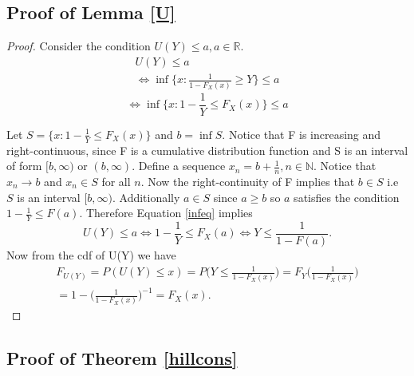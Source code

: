 \documentclass[english,12pt,a4paper,pdftex,sci,utf8]{aaltothesis} %
\begin{document}
\subsection{Proof of Lemma \ref{U}}

\begin{proof}
Consider the condition $U(Y) \leq a, a \in \mathbb{R}$.
\begin{equation*}
\begin{split}
U(Y) \leq a \\
\Leftrightarrow \inf\big\{x: \frac{1}{1-F_X(x)} \geq Y\big\} \leq a
\end{split}
\end{equation*}
\begin{equation}
\Leftrightarrow \inf\big\{x: 1 - \frac{1}{Y} \leq F_X(x)\big\} \leq a
\label{infeq}
\end{equation}


Let $S=\big\{x: 1 - \frac{1}{Y} \leq F_X(x)\big\}$ and $b = \inf S$. Notice that F is increasing and right-continuous, since F is a cumulative distribution function and S is an interval of form $[b,\infty)$ or $(b, \infty)$. Define a sequence $x_n=b+\frac{1}{n}, n\in \mathbb{N}$. Notice that $x_n \rightarrow b$ and $x_n \in S$ for all $n$. Now the right-continuity of F implies that $b \in S$ i.e $S$ is an interval $[b, \infty)$. Additionally $a \in S$ since $a\geq b$ so $a$ satisfies the condition $1-\frac{1}{Y} \leq F(a)$. Therefore Equation \eqref{infeq} implies
\begin{equation*}
U(Y) \leq a \Leftrightarrow 1 - \frac{1}{Y} \leq F_X(a) \Leftrightarrow Y \leq \frac{1}{1-F(a)}.
\end{equation*}
Now from the cdf of U(Y) we have
\begin{equation*}
\begin{split}
F_{U(Y)} = P(U(Y) \leq x) = P\Big(Y \leq \frac{1}{1-F_X(x)}\Big) = F_Y\Big(\frac{1}{1-F_X(x)}\Big) \\
= 1-\Big(\frac{1}{1-F_X(x)}\Big)^{-1} =F_X(x).
\end{split}
\end{equation*}
\end{proof}

\subsection{Proof of Theorem \ref{hillcons}}
\end{document}
